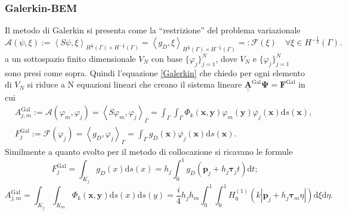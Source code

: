 \subsubsection{Galerkin-BEM}
Il metodo di Galerkin si presenta come la “restrizione” del problema variazionale
\begin{equation}
	\mathcal{A}(\psi,\xi) := \left\langle S\psi,\xi \right\rangle_{H^{\frac{1}{2}}(\Gamma) \times H^{-\frac{1}{2}}(\Gamma)} = \left\langle g_D, \xi \right\rangle_{H^{\frac{1}{2}}(\Gamma) \times H^{-\frac{1}{2}}(\Gamma)} =: \mathcal{F}(\xi) \quad \forall \xi \in H^{-\frac{1}{2}}(\Gamma).
\end{equation}
a un sottospazio finito dimensionale $V_N$ con base $\{\varphi_j\}_{j=1}^N$, dove $V_N$ e $\{\varphi_j\}_{j=1}^N$ sono presi come sopra. Quindi l'equazione \eqref{Galerkin} che chiedo per ogni elemento di $V_N$ si riduce a N equazioni lineari che creano il sistema lineare $\underline{\underline{\textbf{A}}}^{\text{Gal}} \bm{\Psi} = \textbf{F}^{\text{Gal}}$ in cui
\begin{align}
	&A_{j,m}^{\text{Gal}} := \mathcal{A}(\varphi_m,\varphi_j) = \left\langle S\varphi_m, \varphi_j \right\rangle _\Gamma = \int_\Gamma \int_\Gamma \Phi_k(\textbf{x},\textbf{y}) \varphi_m(\textbf{y}) \overline{\varphi_j}(\textbf{x}) \mathrm{d}s(\textbf{x}), \\
	&F_j^{\text{Gal}} := \mathcal{F}(\varphi_j) = \left\langle g_D, \varphi_j \right\rangle _\Gamma = \int_\Gamma g_D(\textbf{x}) \overline{\varphi_j}(\textbf{x}) \mathrm{d}s(\textbf{x}).
\end{align}
Similmente a quanto svolto per il metodo di collocazione si ricavano le formule
\begin{equation}
	F_j^{\text{Gal}} = \int_{K_j} g_D(x) \mathrm{d}s(x) = h_j \int_0^1 g_D(\textbf{p}_j + h_j\bm{\tau}_jt) \mathrm{d}t;
\end{equation}
\begin{equation}
	A_{j,m}^{\text{Gal}} = \int_{K_j}\int_{K_m} \Phi_k(\textbf{x},\textbf{y}) \mathrm{d}s(x) \mathrm{d}s(y) = \frac{i}{4} h_j h_m \int_0^1 \int_0^1 H^{(1)}_0 (k |\textbf{p}_j + h_j \bm{\tau}_m \eta|) \mathrm{d}\xi\mathrm{d}\eta.
\end{equation}
